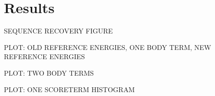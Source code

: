 \section{Results}
SEQUENCE RECOVERY FIGURE

PLOT: OLD REFERENCE ENERGIES, ONE BODY TERM, NEW REFERENCE ENERGIES

PLOT: TWO BODY TERMS

PLOT: ONE SCORETERM HISTOGRAM

